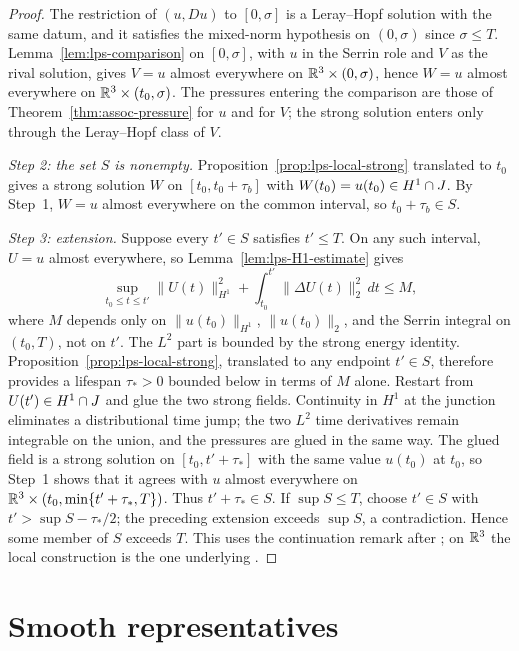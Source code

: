 \documentclass[11pt,letterpaper]{article}
\numberwithin{equation}{section}
\theoremstyle{plain}
\theoremstyle{definition}
\theoremstyle{remark}
\begin{document}
\begin{proof}
The restriction of $(u,Du)$ to $[0,\sigma]$ is a Leray--Hopf solution with the
same datum, and it satisfies the mixed-norm hypothesis on $(0,\sigma)$ since
$\sigma\le T$. Lemma~\ref{lem:lps-comparison} on $[0,\sigma]$, with $u$ in the
Serrin role and $V$ as the rival solution, gives $V=u$ almost everywhere on
$\mathbb{R}^3\times(0,\sigma)$, hence $W=u$ almost everywhere on
$\mathbb{R}^3\times(t_0,\sigma)$. The pressures entering the comparison are those of
Theorem~\ref{thm:assoc-pressure} for $u$ and for $V$; the strong solution
enters only through the Leray--Hopf class of $V$.

\emph{Step 2: the set $S$ is nonempty.}
Proposition~\ref{prop:lps-local-strong} translated to $t_0$ gives a strong
solution $W$ on $[t_0,t_0+\tau_b]$ with $W(t_0)=u(t_0)\in H^1\cap J$. By
Step~1, $W=u$ almost everywhere on the common interval, so
$t_0+\tau_b\in S$.

\emph{Step 3: extension.}
Suppose every $t'\in S$ satisfies $t'\le T$. On any such interval,
$U=u$ almost everywhere, so Lemma~\ref{lem:lps-H1-estimate} gives
\[
\sup_{t_0\le t\le t'}\|U(t)\|_{H^1}^2
 +\int_{t_0}^{t'}\|\Delta U(t)\|_2^2\,dt
\le M,
\]
where $M$ depends only on $\|u(t_0)\|_{H^1}$,
$\|u(t_0)\|_2$, and the Serrin integral on $(t_0,T)$, not on $t'$.
The $L^2$ part is bounded by the strong energy identity.
Proposition~\ref{prop:lps-local-strong}, translated to any endpoint
$t'\in S$, therefore provides a lifespan $\tau_*>0$ bounded below
in terms of $M$ alone. Restart from $U(t')\in H^1\cap J$ and glue
the two strong fields. Continuity in $H^1$ at the junction eliminates
a distributional time jump; the two $L^2$ time derivatives remain
integrable on the union, and the pressures are glued in the same way. The
glued field is a strong solution on $[t_0,t'+\tau_*]$ with the same value
$u(t_0)$ at $t_0$, so Step~1 shows that it agrees with $u$ almost everywhere
on $\mathbb{R}^3\times(t_0,\min\{t'+\tau_*,T\})$. Thus $t'+\tau_*\in S$.
If $\sup S\le T$, choose $t'\in S$ with
$t'>\sup S-\tau_*/2$; the preceding extension exceeds $\sup S$,
a contradiction. Hence some member of $S$ exceeds $T$.
This uses the continuation remark after
\cite[Corollary~6.9, printed p.~137]{RobinsonRodrigoSadowski2016};
on $\mathbb{R}^3$ the local construction is the one underlying
\cite[Theorem~6.15, printed pp.~144--145]{RobinsonRodrigoSadowski2016}.
\end{proof}

\section{Smooth representatives}\label{sec:lps-smooth}
\end{document}
